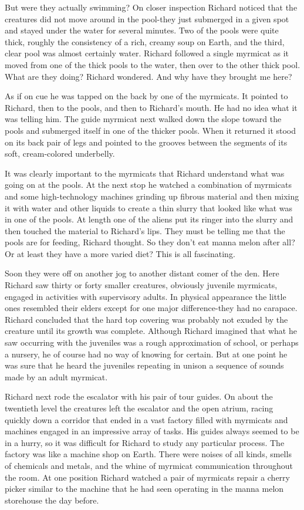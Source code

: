 \documentclass[]{article}
\begin{document}
{{But were they actually swimming? On closer inspection Richard noticed that the creatures did not move around in the pool-they just submerged in a given spot and stayed under the water for several minutes.  Two of the pools were quite thick, roughly the consistency of a rich, creamy soup on Earth, and the third, clear pool was almost certainly water.  Richard followed a single myrmicat as it moved from one of the thick pools to the water, then over to the other thick pool.  What are they doing? Richard wondered.  And why have they brought me here?

As if on cue he was tapped on the back by one of the myrmicats.  It pointed to Richard, then to the pools, and then to Richard’s mouth.  He had no idea what it was telling him.  The guide myrmicat next walked down the slope toward the pools and submerged itself in one of the thicker pools.  When it returned it stood on its back pair of legs and pointed to the grooves between the segments of its soft, cream-colored underbelly.

It was clearly important to the myrmicats that Richard understand what was going on at the pools.  At the next stop he watched a combination of myrmicats and some high-technology machines grinding up fibrous material and then mixing it with water and other liquids to create a thin slurry that looked like what was in one of the pools.  At length one of the aliens put its ringer into the slurry and then touched the material to Richard’s lips.  They must be telling me that the pools are for feeding, Richard thought.  So they don’t eat manna melon after all? Or at least they have a more varied diet? This is all fascinating.

Soon they were off on another jog to another distant comer of the den.  Here Richard saw thirty or forty smaller creatures, obviously juvenile myrmicats, engaged in activities with supervisory adults.  In physical appearance the little ones resembled their elders except for one major difference-they had no carapace.  Richard concluded that the hard top covering was probably not exuded by the creature until its growth was complete.  Although Richard imagined that what he saw occurring with the juveniles was a rough approximation of school, or perhaps a nursery, he of course had no way of knowing for certain.  But at one point he was sure that he heard the juveniles repeating in unison a sequence of sounds made by an adult myrmicat.

Richard next rode the escalator with his pair of tour guides.  On about the twentieth level the creatures left the escalator and the open atrium, racing quickly down a corridor that ended in a vast factory filled with myrmicats and machines engaged in an impressive array of tasks.  His guides always seemed to be in a hurry, so it was difficult for Richard to study any particular process.  The factory was like a machine shop on Earth.  There were noises of all kinds, smells of chemicals and metals, and the whine of myrmicat communication throughout the room.  At one position Richard watched a pair of myrmicats repair a cherry picker similar to the machine that he had seen operating in the manna melon storehouse the day before.

}}
\end{document}
